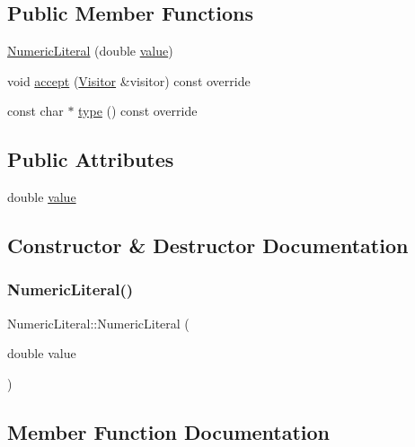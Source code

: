 \subsection*{Public Member Functions}
\begin{DoxyCompactItemize}
\item 
\hyperlink{struct_numeric_literal_a7d8479432e5f17a657279050ca611e33}{Numeric\+Literal} (double \hyperlink{struct_numeric_literal_adeef869e11ca886648a0ccb723dc6639}{value})
\item 
void \hyperlink{struct_numeric_literal_aa18c06c1b739ba725cad0593c6bde1f4}{accept} (\hyperlink{struct_visitor}{Visitor} \&visitor) const override
\item 
const char $\ast$ \hyperlink{struct_numeric_literal_a685ec9d2678a8fb5df8b4ec1a580b762}{type} () const override
\end{DoxyCompactItemize}
\subsection*{Public Attributes}
\begin{DoxyCompactItemize}
\item 
double \hyperlink{struct_numeric_literal_adeef869e11ca886648a0ccb723dc6639}{value}
\end{DoxyCompactItemize}


\subsection{Constructor \& Destructor Documentation}
\mbox{\label{struct_numeric_literal_a7d8479432e5f17a657279050ca611e33}} 
\subsubsection{\texorpdfstring{Numeric\+Literal()}{NumericLiteral()}}
{\footnotesize\ttfamily Numeric\+Literal\+::\+Numeric\+Literal (\begin{DoxyParamCaption}\item[{double}]{value }\end{DoxyParamCaption})\hspace{0.3cm}{\ttfamily [inline]}}



\subsection{Member Function Documentation}
\mbox{\label{struct_numeric_literal_aa18c06c1b739ba725cad0593c6bde1f4}} 
